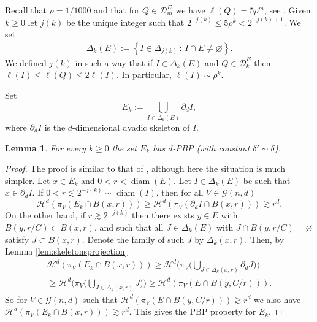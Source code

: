 \documentclass[11pt,reqno]{amsart}
\def\dG{{\mathcal{G}}}
\renewcommand{\d}{{\partial}}
\DeclareMathOperator{\diam}{diam}
\newcommand{\ck}[1]{\left\{#1 \right\}}
\newtheorem{lemma}[theorem]{Lemma}
\theoremstyle{definition}
\theoremstyle{remark}
\numberwithin{equation}{section}
\newcommand{\dD}{\mathcal{D}}
\newcommand{\DD}{\mathcal{D}}
\theoremstyle{theorem}
\theoremstyle{definition}
\theoremstyle{remark}
\numberwithin{equation}{section}
\begin{document}
	Recall that $\rho=1/1000$ and that for $Q\in\DD^E_m$ we have $\ell(Q)=5\rho^m$, see . Given $k\ge0$ let $j(k)$ be the unique integer such that $2^{-j(k)}\le 5\rho^k < 2^{-j(k)+1}$. We set
	\begin{align} \label{e:Delta-ck}
	\Delta_{k}(E) :=  \ck{ I \in \Delta_{j(k)} \, :\, I \cap E \neq \varnothing}.
	\end{align}
	We defined $j(k)$ in such a way that if $I\in\Delta_k(E)$ and $Q\in \dD^E_k$ then $\ell(I)\le \ell(Q)\le 2\ell(I)$. In particular, $\ell(I)\sim \rho^k$.
	
	Set
	\begin{equation}\label{eq:Ekdef}
	E_k := \bigcup_{I \in \Delta_{k}(E)} \partial_d I,
	\end{equation}
	where $\partial_d I$ is the $d$-dimensional dyadic skeleton of $I$.
 \begin{lemma}
     For every $k\ge 0$ the set $E_k$ has $d$-PBP (with constant $\delta'\sim \delta$).
 \end{lemma}
 \begin{proof}
     The proof is similar to that of , although here the situation is much simpler. Let $x\in E_k$ and $0<r<\diam(E)$. Let $I\in \Delta_k(E)$ be such that $x\in \d_d I$. If $0<r\lesssim 2^{-j(k)}\sim\diam(I)$, then for all $V\in \dG(n,d)$
 \begin{equation*}
     \mathcal{H}^d(\pi_V(E_k\cap B(x,r)))\ge \mathcal{H}^d(\pi_V(\d_d I\cap B(x,r)))\gtrsim r^d.
 \end{equation*}
On the other hand, if $r\gtrsim 2^{-j(k)}$ then there exists $y\in E$ with $B(y,r/C)\subset B(x,r)$, and such that all $J\in\Delta_k(E)$ with $J\cap B(y,r/C)=\varnothing$ satisfy $J\subset B(x,r)$. Denote the family of such $J$ by $\Delta_k(x,r)$. Then, by Lemma \ref{lem:skeletonsprojection}
 \begin{multline*}
     \mathcal{H}^d(\pi_V(E_k\cap B(x,r)))\ge \mathcal{H}^d\bigg(\pi_V\bigg(\bigcup_{J\in\Delta_k(x,r)}\d_dJ\bigg)\bigg)\\
     \ge \mathcal{H}^d\bigg(\pi_V\bigg(\bigcup_{J\in\Delta_k(x,r)}J\bigg)\bigg)\ge \mathcal{H}^d(\pi_V(E\cap B(y,C/r))).
 \end{multline*}
 So for $V\in\dG(n,d)$ such that $\mathcal{H}^d(\pi_V(E\cap B(y,C/r)))\gtrsim r^d$ we also have $\mathcal{H}^d(\pi_V(E_k\cap B(x,r)))\gtrsim r^d$. This gives the PBP property for $E_k$.
 \end{proof}
 
%
%
	
\end{document}
